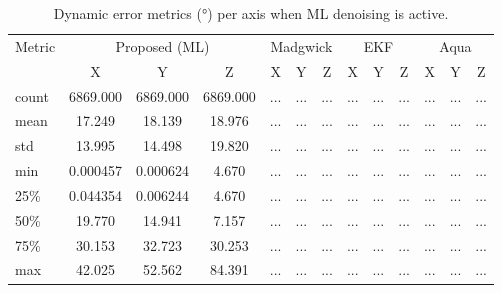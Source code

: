 \documentclass{iutbscthesis}
\begin{document}
\begin{table}[ht]
\centering
\caption{Dynamic error metrics (°) per axis when ML denoising is active.}
\label{tab:dynamic_ml}
\begin{tabular}{l
  *{4}{ccc}
}
\toprule
Metric & \multicolumn{3}{c}{Proposed (ML)} & \multicolumn{3}{c}{Madgwick} & \multicolumn{3}{c}{EKF} & \multicolumn{3}{c}{Aqua} \\
 & X & Y & Z & X & Y & Z & X & Y & Z & X & Y & Z \\
\midrule
count & 6869.000 & 6869.000 & 6869.000 & ... & ... & ... & ... & ... & ... & ... & ... & ... \\
mean & 17.249 & 18.139 & 18.976 & ... & ... & ... & ... & ... & ... & ... & ... & ... \\
std & 13.995 & 14.498 & 19.820 & ... & ... & ... & ... & ... & ... & ... & ... & ... \\
min & 0.000457 & 0.000624 & 4.670 & ... & ... & ... & ... & ... & ... & ... & ... & ... \\
25\% & 0.044354 & 0.006244 & 4.670 & ... & ... & ... & ... & ... & ... & ... & ... & ... \\
50\% & 19.770 & 14.941 & 7.157 & ... & ... & ... & ... & ... & ... & ... & ... & ... \\
75\% & 30.153 & 32.723 & 30.253 & ... & ... & ... & ... & ... & ... & ... & ... & ... \\
max & 42.025 & 52.562 & 84.391 & ... & ... & ... & ... & ... & ... & ... & ... & ... \\
\bottomrule
\end{tabular}
\end{table}
\end{document}
